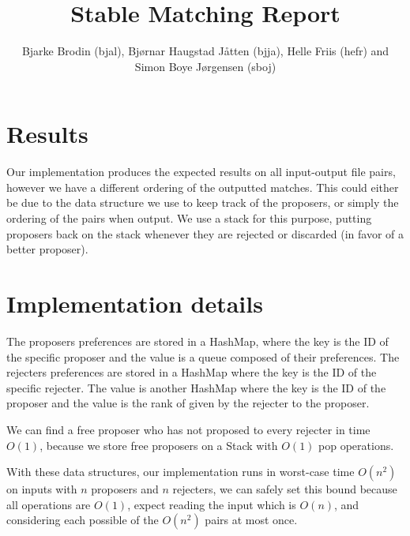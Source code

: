 \documentclass{tufte-handout}
\title{Stable Matching Report}
\author{Bjarke Brodin (bjal), Bjørnar Haugstad Jåtten (bjja), Helle Friis (hefr) and Simon Boye Jørgensen (sboj)}
\begin{document}
  \maketitle

  \section{Results}

  Our implementation produces the expected results 
  on all input-output file pairs, 
  however we have a different ordering of the outputted matches.
  This could either be due to the data structure we use to keep 
  track of the proposers,
  or simply the ordering of the pairs when output. 
  We use a stack for this purpose,
  putting proposers back on the stack
  whenever they are rejected or discarded 
  (in favor of a better proposer).

  \section{Implementation details}
  
  The proposers preferences are stored in a HashMap, 
  where the key is the ID of the specific proposer and 
  the value is a queue composed of their preferences.
  The rejecters preferences are stored in a HashMap where the key is the ID of the specific rejecter. 
  The value is another HashMap where the key is the ID of the proposer and the value is the rank of given by the rejecter to the proposer.

  \vspace{1em}

  We can find a free proposer who has not proposed to every rejecter in time $O(1)$,
  because we store free proposers on a Stack with $O(1)$ pop operations.

  \vspace{1em}

  With these data structures, 
  our implementation runs in worst-case time $O(n^2)$ on inputs with $n$ proposers and $n$ rejecters,
  we can safely set this bound because all operations are $O(1)$,
  expect reading the input which is $O(n)$,
  and considering each possible of the $O(n^2)$ pairs at most once.
\end{document}
